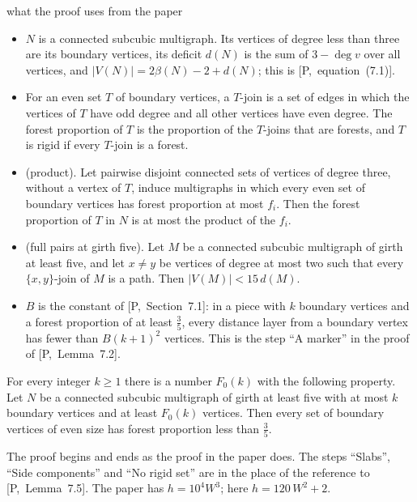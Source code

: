 \documentclass[11pt]{article}
\newcommand{\inP}[1]{[P,~#1]}
\begin{document}
\begin{notation}{what the proof uses from the paper}
\begin{itemize}[leftmargin=1.2em]
\item $N$ is a connected subcubic multigraph. Its vertices of degree less than three are its
boundary vertices, its deficit $d(N)$ is the sum of $3-\deg v$ over all vertices, and
$|V(N)|=2\beta(N)-2+d(N)$; this is \inP{equation~(7.1)}.
\item For an even set $T$ of boundary vertices, a $T$-join is a set of edges in which the
vertices of $T$ have odd degree and all other vertices have even degree. The forest proportion
of $T$ is the proportion of the $T$-joins that are forests, and $T$ is rigid if every $T$-join
is a forest.
\item \inP{Lemma~7.3} (product). Let pairwise disjoint connected sets of vertices of degree
three, without a vertex of $T$, induce multigraphs in which every even set of boundary vertices
has forest proportion at most $f_i$. Then the forest proportion of $T$ in $N$ is at most the
product of the $f_i$.
\item \inP{Lemma~7.4} (full pairs at girth five). Let $M$ be a connected subcubic multigraph of
girth at least five, and let $x\ne y$ be vertices of degree at most two such that every
$\{x,y\}$-join of $M$ is a path. Then $|V(M)|<15\,d(M)$.
\item $B$ is the constant of \inP{Section~7.1}: in a piece with $k$ boundary vertices and a
forest proportion of at least $\frac35$, every distance layer from a boundary vertex has fewer
than $B(k+1)^{2}$ vertices. This is the step ``A marker'' in the proof of \inP{Lemma~7.2}.
\end{itemize}
\end{notation}

\begin{lemma}[Pieces at girth five; this is {\inP{Lemma~7.6}}]\label{lem:pieces}
For every integer $k\ge1$ there is a number $F_0(k)$ with the following property. Let $N$ be a
connected subcubic multigraph of girth at least five with at most $k$ boundary vertices and at
least $F_0(k)$ vertices. Then every set of boundary vertices of even size has forest proportion
less than $\frac35$.
\end{lemma}





The proof begins and ends as the proof in the paper does. The steps ``Slabs'', ``Side
components'' and ``No rigid set'' are in the place of the reference to \inP{Lemma~7.5}. The
paper has $h=10^{4}W^{3}$; here $h=120\,W^{2}+2$.
\end{document}
